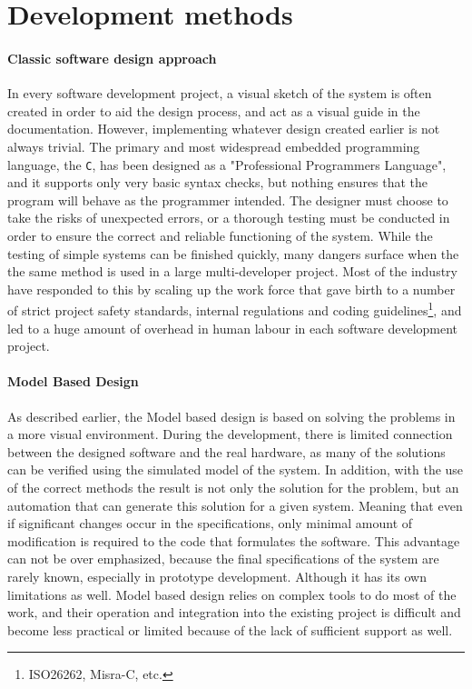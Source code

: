 \section{Development methods}

\paragraph{Classic software design approach}

In every software development project, a visual sketch of the system is often created in order to aid the design process, and act as a visual guide in the documentation. However, implementing whatever design created earlier is not always trivial. The primary and most widespread embedded programming language, the \verb!C!, has been designed as a "Professional Programmers Language", and it supports only very basic syntax checks, but nothing ensures that the program will behave as the programmer intended. The designer must choose to take the risks of unexpected errors, or a thorough testing must be conducted in order to ensure the correct and reliable functioning of the system. While the testing of simple systems can be finished quickly, many dangers surface when the the same method is used in a large multi-developer project. Most of the industry have responded to this by scaling up the work force that gave birth to a number of strict project safety standards, internal regulations and coding guidelines\footnote{ISO26262, Misra-C, etc.}, and led to a huge amount of overhead in human labour in each software development project.

\paragraph{Model Based Design}

As described earlier, the Model based design is based on solving the problems in a more visual environment. During the development, there is  limited connection between the designed software and the real hardware, as many of the solutions can be verified using the simulated model of the system.
In addition, with the use of the correct methods the result is not only the solution for the problem, but an automation that can generate this solution for a given system. Meaning that even if significant changes occur in the specifications, only minimal amount of modification is required to the code that formulates the software. This advantage can not be over emphasized, because the final specifications of the system are rarely known, especially in prototype development.
Although it has its own limitations as well. Model based design relies on complex tools to do most of the work, and their operation and integration into the existing project is difficult and become less practical or limited because of the lack of sufficient support as well.

